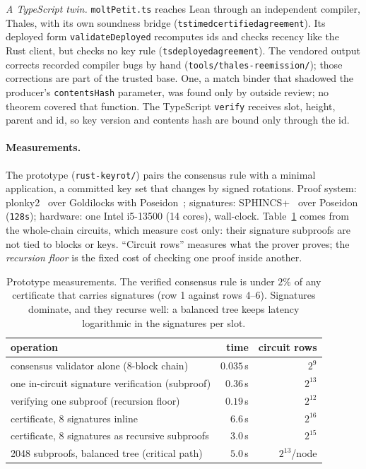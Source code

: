 \documentclass[10pt]{article}
\DeclareRobustCommand{\code}[1]{{\renewcommand{\_}{\textunderscore\allowbreak}\texttt{#1}}}
\begin{document}
\emph{A TypeScript twin.} \code{moltPetit.ts} reaches Lean through an
independent compiler, Thales, with its own soundness bridge
(\code{ts\_timed\_certified\_agreement}). Its deployed form
\code{validateDeployed} recomputes ids and checks recency like the Rust
client, but checks no key rule (\code{ts\_deployed\_agreement}). The vendored output corrects
recorded compiler bugs by hand (\code{tools/thales-reemission/}); those
corrections are part of the trusted base. One, a match binder that
shadowed the producer's \code{contentsHash} parameter, was found only by
outside review; no theorem covered that function. The TypeScript
\code{verify} receives slot, height, parent and id, so key version and contents hash are bound only through the id.

\paragraph{Measurements.} The prototype (\code{rust-keyrot/}) pairs the
consensus rule with a minimal application, a committed key set that
changes by signed rotations. Proof system: plonky2~\cite{plonky2} over
Goldilocks with Poseidon~\cite{poseidon}; signatures:
SPHINCS+~\cite{sphincsplus,fips205} over Poseidon (\code{128s});
hardware: one Intel i5-13500 (14 cores), wall-clock. Table~\ref{tab:bench}
comes from the whole-chain circuits, which measure cost only: their
signature subproofs are not tied to blocks or keys. ``Circuit rows''
measures what the prover proves; the \emph{recursion floor} is the fixed
cost of checking one proof inside another.

\begin{table}[t]
\centering
\small
\begin{tabular}{lrr}
\toprule
operation & time & circuit rows \\
\midrule
consensus validator alone (8-block chain) & $0.035$\,s & $2^{9}$ \\
one in-circuit signature verification (subproof) & $0.36$\,s & $2^{13}$ \\
verifying one subproof (recursion floor) & $0.19$\,s & $2^{12}$ \\
certificate, 8 signatures inline & $6.6$\,s & $2^{16}$ \\
certificate, 8 signatures as recursive subproofs & $3.0$\,s & $2^{15}$ \\
2048 subproofs, balanced tree (critical path) & $5.0$\,s & $2^{13}$/node \\
\bottomrule
\end{tabular}
\caption{Prototype measurements. The verified consensus rule is under
$2\%$ of any certificate that carries signatures (row 1 against rows
4--6). Signatures dominate, and they recurse well: a balanced tree keeps
latency logarithmic in the signatures per slot.}
\label{tab:bench}
\end{table}
\end{document}
